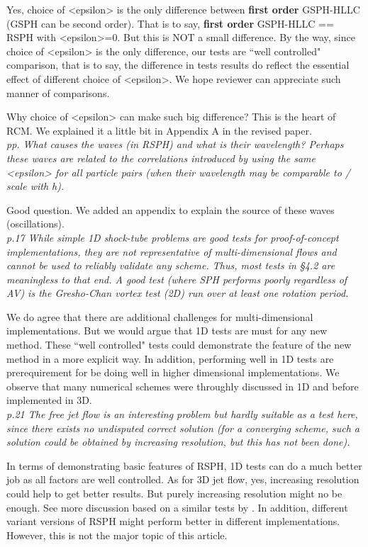\documentclass[10pt,a4paper]{article}
\begin{document}
Yes, choice of <epsilon> is the only difference between \textbf{first order} GSPH-HLLC (GSPH can be second order). That is to say, \textbf{first order} GSPH-HLLC == RSPH with <epsilon>=0.
But this is NOT a small difference.
By the way, since choice of <epsilon> is the only difference, our tests are ``well controlled" comparison, that is to say, the difference in tests results do reflect the essential effect of different choice of <epsilon>. We hope reviewer can appreciate such manner of comparisons.

Why choice of <epsilon> can make such big difference? This is the heart of RCM. We explained it a little bit in Appendix A in the revised paper. 
\\[3pt]

\textit{pp. What causes the waves (in RSPH) and what is their wavelength? Perhaps
these waves are related to the correlations introduced by using the same
<epsilon> for all particle pairs (when their wavelength may be comparable
to / scale with h).}

Good question. We added an appendix to explain the source of these waves (oscillations).
\\[3pt]

\textit{p.17 While simple 1D shock-tube problems are good tests for proof-of-concept implementations, they are not representative of
multi-dimensional flows and cannot be used to reliably validate any scheme. Thus, most tests in §4.2 are meaningless to that end.
A good test (where SPH performs poorly regardless of AV) is the Gresho-Chan vortex test (2D) run over at least one rotation period.}

We do agree that there are additional challenges for multi-dimensional implementations. But we would argue that 1D tests are must for any new method. These ``well controlled" tests could demonstrate the feature of the new method in a more explicit way. In addition, performing well in 1D tests are prerequirement for be doing well in higher dimensional implementations. We observe that many numerical schemes were throughly discussed in 1D and before implemented in 3D.
\\[3pt]

\textit{p.21 The free jet flow is an interesting problem but hardly suitable as a
test here, since there exists no undisputed correct solution (for a converging scheme, such a solution could be obtained by increasing resolution, but this has not been done).}

In terms of demonstrating basic features of RSPH, 1D tests can do a much better job as all factors are well controlled. 
As for 3D jet flow, yes, increasing resolution could help to get better results. But purely increasing resolution might no be enough. See more discussion based on a similar tests by \citet{cha2010kelvin}. 
In addition, different variant versions of RSPH might perform better in different implementations. However, this is not the major topic of this article.
\\[3pt]
\end{document}
